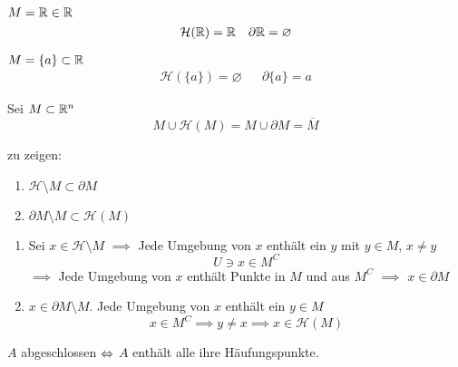 \begin{Bsp}
  $M=\mathbb{R}\in\mathbb{R}$
  \begin{align*}
    \mathcal{H}(\mathbb{R})=\mathbb{R} && \partial\mathbb{R}=\varnothing
  \end{align*}
\end{Bsp}
\begin{Bsp}
  $M=\{a\}\subset\mathbb{R}$
  \begin{align*}
    \mathcal{H}(\{a\})=\varnothing && \partial\{a\}=a
  \end{align*}
\end{Bsp}
\begin{Lem}
  Sei $M\subset\mathbb{R}^n$
  \[M\cup\mathcal{H}(M)=M\cup\partial M=\overline{M}\]
\end{Lem}
\begin{Bew}
  zu zeigen: 
  \begin{enumerate}
    \item $\mathcal{H}\setminus M\subset\partial M$
    \item $\partial M\setminus M\subset\mathcal{H}(M)$
  \end{enumerate}
  \begin{enumerate}
    \item Sei $x\in\mathcal{H}\setminus M$ $\implies$ Jede Umgebung von $x$ enthält ein $y$ mit $y\in M$, $x\neq y$
      \[U\ni x\in M^C\] %
      $\implies$ Jede Umgebung von $x$ enthält Punkte in $M$ und aus $M^C$ $\implies$ $x\in \partial M$
    \item $x\in \partial M\setminus M$. Jede Umgebung von $x$ enthält ein $y\in M$
      \[x\in M^C\implies y\neq x\implies x\in\mathcal{H}(M)\]
  \end{enumerate}
\end{Bew}
\begin{Kor}
  $A$ abgeschlossen $\Leftrightarrow$ $A$ enthält alle ihre Häufungspunkte.
\end{Kor}
